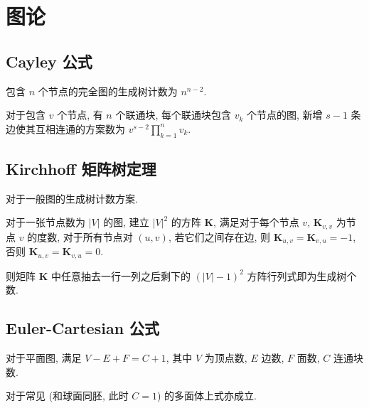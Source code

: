 \clearpage
\section{图论}

\subsection{Cayley 公式}
包含 $n$ 个节点的完全图的生成树计数为 $n^{n-2}$.

对于包含 $v$ 个节点, 有 $n$ 个联通块, 每个联通块包含 $v_k$ 个节点的图, 新增 $s-1$ 条边使其互相连通的方案数为 $\displaystyle v^{s-2}\prod_{k=1}^nv_k$.

\subsection{Kirchhoff 矩阵树定理}
对于一般图的生成树计数方案.

对于一张节点数为 $|V|$ 的图, 建立 $|V|^2$ 的方阵 $\mathbf K$, 满足对于每个节点 $v$, $\mathbf K_{v,v}$ 为节点 $v$ 的度数, 对于所有节点对 $(u,v)$, 若它们之间存在边, 则 $\mathbf K_{u,v}=\mathbf K_{v,u}=-1$, 否则 $\mathbf K_{u,v}=\mathbf K_{v,u}=0$.

则矩阵 $\mathbf K$ 中任意抽去一行一列之后剩下的 $(|V|-1)^2$ 方阵行列式即为生成树个数.

\subsection{Euler-Cartesian 公式}
对于平面图, 满足 $V-E+F=C+1$, 其中 $V$ 为顶点数, $E$ 边数, $F$ 面数, $C$ 连通块数.

对于常见 (和球面同胚, 此时 $C=1$) 的多面体上式亦成立.
